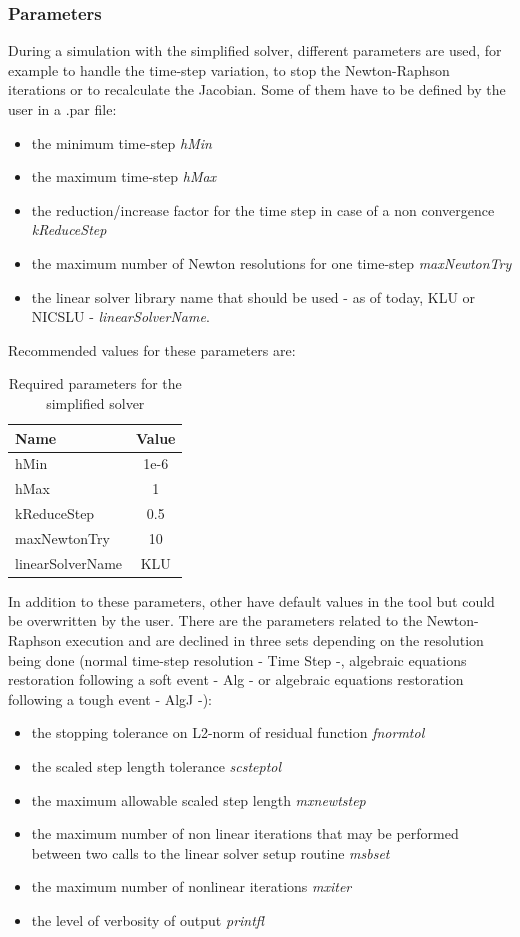\documentclass[a4paper, 12pt]{report}
\begin{document}
\subsubsection{Parameters}

During a simulation with the simplified solver, different parameters are used, for example to handle the time-step variation, to stop the Newton-Raphson iterations or to recalculate the Jacobian. Some of them have to be defined by the user in a .par file:
\begin{itemize}
\item the minimum time-step \textit{hMin}
\item the maximum time-step \textit{hMax}
\item the reduction/increase factor for the time step in case of a non convergence \textit{kReduceStep}
\item the maximum number of Newton resolutions for one time-step \textit{maxNewtonTry}
\item the linear solver library name that should be used - as of today, KLU or NICSLU - \textit{linearSolverName}.
\end{itemize}

Recommended values for these parameters are:
\begin{table}[h!]
\center
\begin{tabular}{ l | c }
\toprule
\textbf{{Name}} & \textbf{{Value}} \\
\midrule
hMin & 1e-6 \\
hMax & 1 \\
kReduceStep & 0.5 \\
maxNewtonTry & 10 \\
linearSolverName & KLU \\
\bottomrule
\end{tabular}
\caption{Required parameters for the simplified solver}
\end{table}

In addition to these parameters, other have default values in the tool but could be overwritten by the user. There are the parameters related to the Newton-Raphson execution and are declined in three sets depending on the resolution being done (normal time-step resolution - Time Step -, algebraic equations restoration following a soft event - Alg - or algebraic equations restoration following a tough event - AlgJ -):
\begin{itemize}
\item the stopping tolerance on L2-norm of residual function \textit{fnormtol}
\item the scaled step length tolerance \textit{scsteptol}
\item the maximum allowable scaled step length \textit{mxnewtstep}
\item the maximum number of non linear iterations that may be performed between two calls to the linear solver setup routine \textit{msbset}
\item the maximum number of nonlinear iterations \textit{mxiter}
\item the level of verbosity of output \textit{printfl}
\end{itemize}
\end{document}
